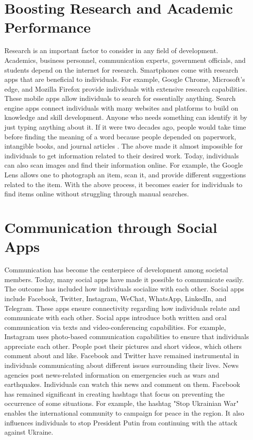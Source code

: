 \documentclass{article}
\begin{document}
\section*{Boosting Research and Academic Performance}
Research is an important factor to consider in any field of development. Academics, business personnel, communication experts, government officials, and students depend on the internet for research. Smartphones come with research apps that are beneficial to individuals. For example, Google Chrome, Microsoft's edge, and Mozilla Firefox provide individuals with extensive research capabilities. These mobile apps allow individuals to search for essentially anything. Search engine apps connect individuals with many websites and platforms to build on knowledge and skill development.
Anyone who needs something can identify it by just typing anything about it. If it were two decades ago, people would take time before finding the meaning of a word because people depended on paperwork, intangible books, and journal articles \cite{Stocchi21}. The above made it almost impossible for individuals to get information related to their desired work. Today, individuals can also scan images and find their information online. For example, the Google Lens allows one to photograph an item, scan it, and provide different suggestions related to the item. With the above process, it becomes easier for individuals to find items online without struggling through manual searches.

\medskip

\section*{Communication through Social Apps}
Communication has become the centerpiece of development among societal members. Today, many social apps have made it possible to communicate easily. The outcome has included how individuals socialize with each other. Social apps include Facebook, Twitter, Instagram, WeChat, WhatsApp, LinkedIn, and Telegram. These apps ensure connectivity regarding how individuals relate and communicate with each other. Social apps introduce both written and oral communication via texts and video-conferencing capabilities. For example, Instagram uses photo-based communication capabilities to ensure that individuals appreciate each other. People post their pictures and short videos, which others comment about and like. 
Facebook and Twitter have remained instrumental in individuals communicating about different issues surrounding their lives. News agencies post news-related information on emergencies such as wars and earthquakes. Individuals can watch this news and comment on them. Facebook has remained significant in creating hashtags that focus on preventing the occurrence of some situations. For example, the hashtag "Stop Ukrainian War" enables the international community to campaign for peace in the region. It also influences individuals to stop President Putin from continuing with the attack against Ukraine.
\end{document}
